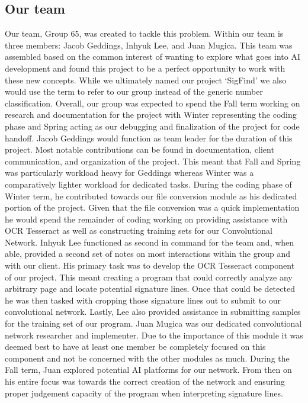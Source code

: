 \documentclass[article, onecolumn, draftclsnofoot,10pt, compsoc]{IEEEtran}
\begin{document}
\subsection{Our team}
Our team, Group 65, was created to tackle this problem. Within our team is three members: Jacob Geddings, Inhyuk Lee, and Juan Mugica. This team was assembled based on the common interest of wanting to explore what goes into AI development and found this project to be a perfect opportunity to work with these new concepts. While we ultimately named our project ‘SigFind’ we also would use the term to refer to our group instead of the generic number classification. Overall, our group was expected to spend the Fall term working on research and documentation for the project with Winter representing the coding phase and Spring acting as our debugging and finalization of the project for code handoff.
Jacob Geddings would function as team leader for the duration of this project. Most notable contributions can be found in documentation, client communication, and organization of the project. This meant that Fall and Spring was particularly workload heavy for Geddings whereas Winter was a comparatively lighter workload for dedicated tasks. During the coding phase of Winter term, he contributed towards our file conversion module as his dedicated portion of the project. Given that the file conversion was a quick implementation he would spend the remainder of coding working on providing assistance with OCR Tesseract as well as constructing training sets for our Convolutional Network. 
Inhyuk Lee functioned as second in command for the team and, when able, provided a second set of notes on most interactions within the group and with our client. His primary task was to develop the OCR Tesseract component of our project. This meant creating a program that could correctly analyze any arbitrary page and locate potential signature lines. Once that could be detected he was then tasked with cropping those signature lines out to submit to our convolutional network. Lastly, Lee also provided assistance in submitting samples for the training set of our program.
Juan Mugica was our dedicated convolutional network researcher and implementer. Due to the importance of this module it was deemed best to have at least one member be completely focused on this component and not be concerned with the other modules as much. During the Fall term, Juan explored potential AI platforms for our network. From then on his entire focus was towards the correct creation of the network and ensuring proper judgement capacity of the program when interpreting signature lines.
\end{document}
